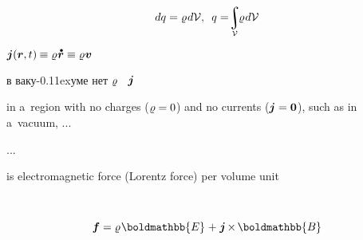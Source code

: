 \nopagebreak\vspace{-0.2em}\begin{equation*}
dq = \chargedensity \hspace{.15ex} d \mathcal{V}
, \hspace{.5em}
q = \hspace{-0.5ex} \scalebox{0.9}{$\displaystyle\integral\displaylimits_{\mathcal{V}}$} \hspace{-0.3ex} \chargedensity \hspace{.15ex} d\mathcal{V}
\end{equation*}

  
${\currentdensity(\locationvector, t) \hspace{-0.1ex} \equiv \chargedensity \hspace{.1ex} \mathdotabove{\locationvector} \equiv \chargedensity \hspace{.1ex} \bm{v}}$

\foreignlanguage{russian}{в ваку\kern-0.11exуме нет $\varrho$ ~$\bm{j}$}

in a~region with no charges (${\varrho = 0}$) and no currents (${\bm{j} = \bm{0}}$), such as in a~vacuum, ...

...

 is electromagnetic force (Lorentz force) per volume unit

   ~   \ru{)} 

\nopagebreak\vspace{-0.2em}\en{\vspace{-0.7em}}\begin{equation}\label{ponderomotive.electromagneticforcepervolumeunit}
\bm{f} = \chargedensity \hspace{.16ex} \boldmathbb{E} \hspace{.1ex} + \hspace{.1ex} \currentdensity \hspace{-0.16ex} \times \hspace{-0.2ex} \boldmathbb{B}
\end{equation}

